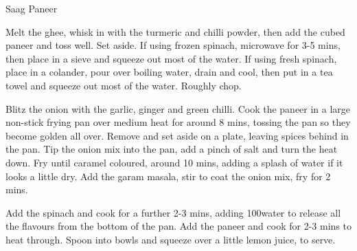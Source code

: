 \begin{recipe}{Saag Paneer}

    \begin{ingredients}
    \end{ingredients}

    \begin{instructions}
        Melt the ghee, whisk in with the turmeric and chilli powder, then add the cubed paneer and toss well.
        Set aside.
        If using frozen spinach, microwave for 3-5 mins, then place in a sieve and squeeze out most of the water.
        If using fresh spinach, place in a colander, pour over boiling water, drain and cool, then put in a tea towel and squeeze out most of the water.
        Roughly chop.

        Blitz the onion with the garlic, ginger and green chilli.
        Cook the paneer in a large non-stick frying pan over medium heat for around 8 mins, tossing the pan so they become golden all over.
        Remove and set aside on a plate, leaving spices behind in the pan.
        Tip the onion mix into the pan, add a pinch of salt and turn the heat down.
        Fry until caramel coloured, around 10 mins, adding a splash of water if it looks a little dry.
        Add the garam masala, stir to coat the onion mix, fry for 2 mins.

        Add the spinach and cook for a further 2-3 mins, adding 100\ml water to release all the flavours from the bottom of the pan.
        Add the paneer and cook for 2-3 mins to heat through.
        Spoon into bowls and squeeze over a little lemon juice, to serve.
    \end{instructions}
\end{recipe}
